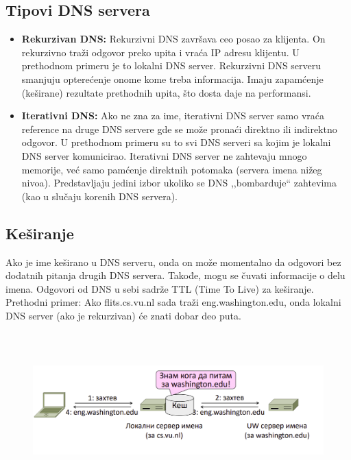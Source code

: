 \documentclass[a4paper]{article}
\begin{document}
    \subsection{Tipovi DNS servera}
        \begin{itemize}
            \item \textbf{Rekurzivan DNS:} Rekurzivni DNS završava ceo posao za klijenta. On
                rekurzivno traži odgovor preko upita i vraća IP adresu klijentu. U prethodnom
                primeru je to lokalni DNS server. Rekurzivni DNS serveru smanjuju opterećenje
                onome kome treba informacija. Imaju zapamćenje (keširane) rezultate prethodnih
                upita, što dosta daje na performansi. 
            \item \textbf{Iterativni DNS:} Ako ne zna za ime, iterativni DNS server samo vraća
                reference na druge DNS servere gde se može pronaći direktno ili indirektno
                odgovor. U prethodnom primeru su to svi DNS serveri sa kojim je lokalni
                DNS server komunicirao. Iterativni DNS server ne zahtevaju mnogo memorije, već
                samo pamćenje direktnih potomaka (servera imena nižeg nivoa). Predstavljaju jedini
                izbor ukoliko se DNS ,,bombarduje`` zahtevima (kao u slučaju korenih DNS servera).
        \end{itemize}

    \subsection{Keširanje}
        Ako je ime keširano u DNS serveru, onda on može momentalno da odgovori bez dodatnih
        pitanja drugih DNS servera. Takođe, mogu se čuvati informacije o delu imena. Odgovori
        od DNS u sebi sadrže TTL (Time To Live) za keširanje.\\
        \indent Prethodni primer: Ako flits.cs.vu.nl sada traži eng.washington.edu, onda 
        lokalni DNS server (ako je rekurzivan) će znati dobar deo puta. 
        \begin{figure}[H]
            \begin{center}
                \includegraphics[width=120mm,height=60mm]{Slike/dns5.png}
            \end{center}
        \end{figure}
\end{document}
